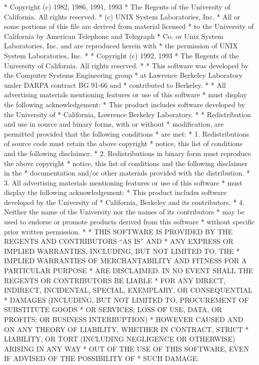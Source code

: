\begin{copyrightEnv}
 * Copyright (c) 1982, 1986, 1991, 1993
 *	The Regents of the University of California.  All rights reserved.
 * (c) UNIX System Laboratories, Inc.
 * All or some portions of this file are derived from material licensed
 * to the University of California by American Telephone and Telegraph
 * Co. or Unix System Laboratories, Inc. and are reproduced herein with
 * the permission of UNIX System Laboratories, Inc.
 *
 * Copyright (c) 1992, 1993
 *	The Regents of the University of California.  All rights reserved.
 *
 * This software was developed by the Computer Systems Engineering group
 * at Lawrence Berkeley Laboratory under DARPA contract BG 91-66 and
 * contributed to Berkeley.
 *
 * All advertising materials mentioning features or use of this software
 * must display the following acknowledgement:
 *	This product includes software developed by the University of
 *	California, Lawrence Berkeley Laboratory.
 *
 * Redistribution and use in source and binary forms, with or without
 * modification, are permitted provided that the following conditions
 * are met:
 * 1. Redistributions of source code must retain the above copyright
 *    notice, this list of conditions and the following disclaimer.
 * 2. Redistributions in binary form must reproduce the above copyright
 *    notice, this list of conditions and the following disclaimer in the
 *    documentation and/or other materials provided with the distribution.
 * 3. All advertising materials mentioning features or use of this software
 *    must display the following acknowledgement:
 *	This product includes software developed by the University of
 *	California, Berkeley and its contributors.
 * 4. Neither the name of the University nor the names of its contributors
 *    may be used to endorse or promote products derived from this software
 *    without specific prior written permission.
 *
 * THIS SOFTWARE IS PROVIDED BY THE REGENTS AND CONTRIBUTORS ``AS IS'' AND
 * ANY EXPRESS OR IMPLIED WARRANTIES, INCLUDING, BUT NOT LIMITED TO, THE
 * IMPLIED WARRANTIES OF MERCHANTABILITY AND FITNESS FOR A PARTICULAR PURPOSE
 * ARE DISCLAIMED.  IN NO EVENT SHALL THE REGENTS OR CONTRIBUTORS BE LIABLE
 * FOR ANY DIRECT, INDIRECT, INCIDENTAL, SPECIAL, EXEMPLARY, OR CONSEQUENTIAL
 * DAMAGES (INCLUDING, BUT NOT LIMITED TO, PROCUREMENT OF SUBSTITUTE GOODS
 * OR SERVICES; LOSS OF USE, DATA, OR PROFITS; OR BUSINESS INTERRUPTION)
 * HOWEVER CAUSED AND ON ANY THEORY OF LIABILITY, WHETHER IN CONTRACT, STRICT
 * LIABILITY, OR TORT (INCLUDING NEGLIGENCE OR OTHERWISE) ARISING IN ANY WAY
 * OUT OF THE USE OF THIS SOFTWARE, EVEN IF ADVISED OF THE POSSIBILITY OF
 * SUCH DAMAGE.
\end{copyrightEnv}

